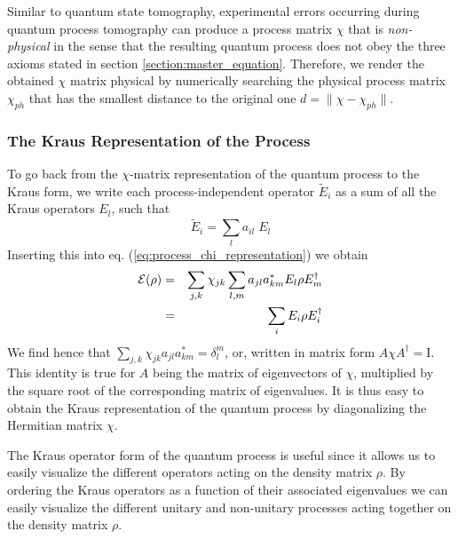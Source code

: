\smallskip

Similar to quantum state tomography, experimental errors occurring during quantum process tomography can produce a process matrix $\chi$ that is {\it non-physical} in the sense that the resulting quantum process does not obey the three axioms stated in section \ref{section:master_equation}. Therefore, we render the obtained $\chi$ matrix physical by numerically searching the  physical process matrix $\chi_{ph}$ that has the smallest distance to the original one $d=\|\chi-\chi_{ph}\|$.

\subsubsection{The Kraus Representation of the Process}

To go back from the $\chi$-matrix representation of the quantum process to the Kraus form, we write each process-independent operator $\tilde{E}_i$ as a sum of all the Kraus operators $E_l$, such that
%
\begin{equation}
	\tilde{E}_i = \sum\limits_l a_{il}\; E_l
\end{equation}
%
Inserting this into eq. (\ref{eq:process_chi_representation}) we obtain
%
\begin{eqnarray}
\begin{mathcal}E\end{mathcal}(\rho) & = & \sum\limits_{j,k}\chi_{jk}\sum\limits_{l,m} a_{jl}a_{km}^* E_l \rho E_m^\dagger   \label{eq:process_chi_transformed} \\
& = & \sum\limits_i E_i \rho E^\dagger_i
\end{eqnarray}
%
We find hence that $\sum\limits_{j,k} \chi_{jk}a_{jl}a_{km}^* = \delta_l^m$, or, written in matrix form $A\chi A^\dagger = \mathrm{I}$. This identity is true for $A$ being the matrix of eigenvectors of $\chi$, multiplied by the square root of the corresponding matrix of eigenvalues. It is thus easy to obtain the Kraus representation of the quantum process by diagonalizing the Hermitian matrix $\chi$.

\smallskip

The Kraus operator form of the quantum process is useful since it allows us to easily visualize the different operators acting on the density matrix $\rho$. By ordering the Kraus operators as a function of their associated eigenvalues we can easily visualize the different unitary and non-unitary processes acting together on the density matrix $\rho$.

